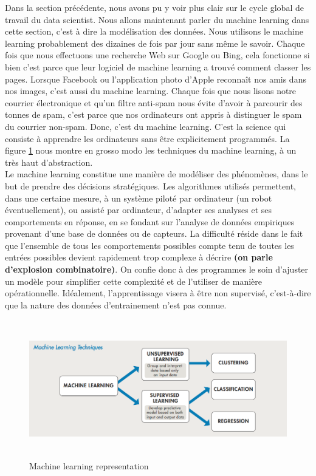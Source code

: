 \documentclass[12pt, french]{article}
\begin{document}
Dans la section précédente, nous avons pu y voir plus clair sur le cycle global de travail du data scientist. Nous allons maintenant parler du machine learning dans cette section, c'est à dire la modélisation des données. Nous utilisons le machine learning probablement des dizaines de fois par jour sans même le savoir. Chaque fois que nous effectuons une recherche Web sur Google ou Bing, cela fonctionne si bien c'est parce que leur logiciel de machine learning a trouvé comment classer les pages. Lorsque Facebook ou l'application photo d'Apple reconnaît nos amis dans nos images, c'est aussi du machine learning. Chaque fois que nous lisons notre courrier électronique et qu'un filtre anti-spam nous évite d'avoir à parcourir des tonnes de spam, c'est parce que nos ordinateurs ont appris à distinguer le spam du courrier non-spam. Donc, c'est du machine learning. C'est la science qui consiste à apprendre les ordinateurs sans être explicitement programmés. La figure \ref{machinelearning} nous montre en grosso modo les techniques du machine learning, à un très haut d'abstraction. \\

Le machine learning constitue une manière de modéliser des phénomènes, dans le but de prendre des décisions stratégiques. Les algorithmes utilisés permettent, dans une certaine mesure, à un système piloté par ordinateur (un robot éventuellement), ou assisté par ordinateur, d'adapter ses analyses et ses comportements en réponse, en se fondant sur l'analyse de données empiriques provenant d'une base de données ou de capteurs. La difficulté réside dans le fait que l'ensemble de tous les comportements possibles compte tenu de toutes les entrées possibles devient rapidement trop complexe à décrire \textbf{(on parle d'explosion combinatoire)}. On confie donc à des programmes le soin d'ajuster un modèle pour simplifier cette complexité et de l'utiliser de manière opérationnelle. Idéalement, l'apprentissage visera à être non supervisé, c'est-à-dire que la nature des données d'entrainement n'est pas connue.
\begin{figure}[h]
\includegraphics[width=15cm, height=6cm]{images/machinelearning.png}
\caption{Machine learning representation}
\label{machinelearning}
\end{figure}
\end{document}
